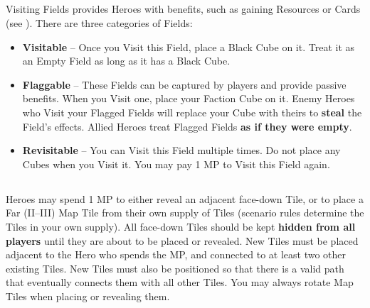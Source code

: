 \begin{multicols}{2}

\subsection*{}
Visiting Fields provides Heroes with benefits, such as gaining Resources or Cards (see ).
There are three categories of Fields:
\begin{itemize}
  \item \textbf{Visitable} – Once you Visit this Field, place a Black Cube on it.
    Treat it as an Empty Field as long as it has a Black Cube.
  \item \textbf{Flaggable} – These Fields can be captured by players and provide passive benefits.
    When you Visit one, place your Faction Cube on it.
    Enemy Heroes who Visit your Flagged Fields will replace your Cube with theirs to \textbf{steal} the Field’s effects.
    Allied Heroes treat Flagged Fields \textbf{as if they were empty}.
  \item \textbf{Revisitable} – You can Visit this Field multiple times.
    Do not place any Cubes when you Visit it.
    You may pay 1 MP to Visit this Field again.
\end{itemize}

\subsection*{}
Heroes may spend 1 MP to either reveal an adjacent face-down Tile, or to place a Far (II–III) Map Tile from their own supply of Tiles (scenario rules determine the Tiles in your own supply).
All face-down Tiles should be kept \textbf{hidden from all players} until they are about to be placed or revealed.
New Tiles must be placed adjacent to the Hero who spends the MP, and connected to at least two other existing Tiles.
New Tiles must also be positioned so that there is a valid path that eventually connects them with all other Tiles.
You may always rotate Map Tiles when placing or revealing them.

\medskip
{}

\end{multicols}

